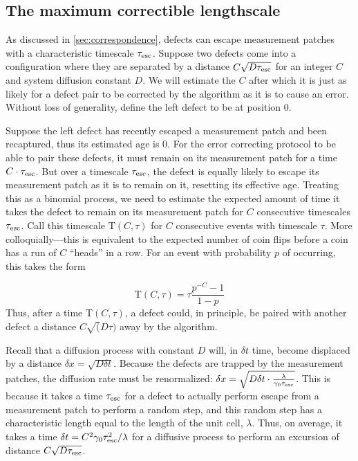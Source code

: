 \documentclass[twocolumn,superscriptaddress,aps,prb,floatfix]{revtex4-1}
\newcommand{\te}{\tau_{\rm{esc}}}
\newcommand{\Tau}{\mathrm{T}}
\begin{document}
\subsection{The maximum correctible lengthscale}

As discussed in \ref{sec:correspondence}, defects can escape measurement patches with a characteristic timescale $\te$.  Suppose two defects come into a configuration where they are separated by a distance $C \sqrt{D \te}$ for an integer $C$ and system diffusion constant $D$.  We will estimate the $C$ after which it is just as likely for a defect pair to be corrected by the algorithm as it is to cause an error.  Without loss of generality, define the left defect to be at position $0$.

Suppose the left defect has recently escaped a measurement patch and been recaptured, thus its estimated age is $0$.  For the error correcting protocol to be able to pair these defects, it must remain on its measurement patch for a time $C\cdot \te$.  But over a timescale $\te$, the defect is equally likely to escape its measurement patch as it is to remain on it, resetting its effective age.  Treating this as a binomial process, we need to estimate the expected amount of time it takes the defect to remain on its measurement patch for $C$ consecutive timescales $\te$.  Call this timescale $\Tau(C,\tau)$ for $C$ consecutive events with timescale $\tau$.  More colloquially---this is equivalent to the expected number of coin flips before a coin has a run of $C$ ``heads'' in a row.  For an event with probability $p$ of occurring, this takes the form

\begin{equation}
\Tau(C,\tau) = \tau \frac{p^{-C} - 1}{1 - p}
\end{equation}
\noindent
Thus, after a time $\Tau(C,\tau)$, a defect could, in principle, be paired with another defect a distance $C \sqrt(D \tau)$ away by the algorithm.

Recall that a diffusion process with constant $D$ will, in $\delta t$ time, become displaced by a distance $\delta x = \sqrt{D \delta t}$.  Because the defects are trapped by the measurement patches, the diffusion rate must be renormalized: $\delta x = \sqrt{D \delta t \cdot \frac{\lambda}{\gamma_0 \te}}$.  This is because it takes a time $\te$ for a defect to actually perform escape from a measurement patch to perform a random step, and this random step has a characteristic length equal to the length of the unit cell, $\lambda$.  Thus, on average, it takes a time $\delta t = C^2 \gamma_0 \te^2 / \lambda$ for a diffusive process to perform an excursion of distance $C \sqrt{D \te}$.
\end{document}
